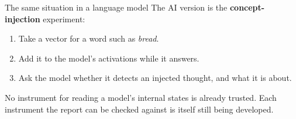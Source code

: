 \documentclass[aspectratio=169,11pt]{beamer}
\begin{document}
\begin{frame}[label=llm]{The same situation in a language model}
The AI version is the \textbf{concept-injection} experiment:

\vspace{0.1em}
\begin{enumerate}\setlength\itemsep{1pt}
  \item {\small Take a vector for a word such as \emph{bread}.}
  \item {\small Add it to the model's activations while it answers.}
  \item {\small Ask the model whether it detects an injected thought, and what it is about.}
\end{enumerate}

\vspace{0.3em}
\begin{center}
\end{center}

{\small No instrument for reading a model's internal states is already trusted. Each instrument the report can be checked against is itself still being developed.}
\end{frame}
\end{document}
